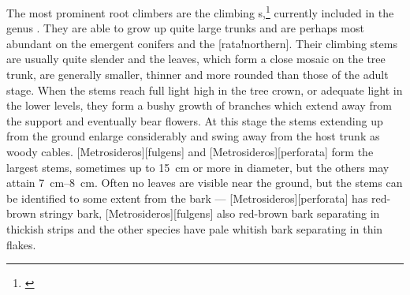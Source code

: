 The most prominent root climbers are the climbing s,\footnote{\cite{dawson1967growth}} currently included in the genus .
They are able to grow up quite large trunks and are perhaps most abundant on the emergent conifers and the [rata!northern].
Their climbing stems are usually quite slender and the leaves, which form a close mosaic on the tree trunk, are generally smaller, thinner and more rounded than those of the adult stage.
When the stems reach full light high in the tree crown, or adequate light in the lower levels, they form a bushy growth of branches which extend away from the support and eventually bear flowers.
At this stage the stems extending up from the ground enlarge considerably and swing away from the host trunk as woody cables. [Metrosideros][fulgens] and [Metrosideros][perforata] form the largest stems, sometimes up to \SI{15}{\centi\metre} or more in diameter, but the others may attain \SIrange{7}{8}{\centi\metre}.
Often no leaves are visible near the ground, but the stems can be identified to some extent from the bark --- [Metrosideros][perforata] has red-brown stringy bark, [Metrosideros][fulgens] also red-brown bark separating in thickish strips and the other species have pale whitish bark separating in thin flakes.

